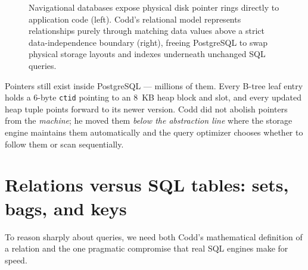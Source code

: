 \begin{figure}[htbp]
\caption{Navigational databases expose physical disk pointer rings directly to application code (left). Codd's relational model represents relationships purely through matching data values above a strict data-independence boundary (right), freeing PostgreSQL to swap physical storage layouts and indexes underneath unchanged SQL queries.}
\label{ch01:fig-codd-independence}
\end{figure}

\begin{intuitionbox}
Pointers still exist inside PostgreSQL --- millions of them. Every B-tree leaf entry holds a 6-byte \texttt{ctid} pointing to an 8~KB heap block and slot, and every updated heap tuple points forward to its newer version. Codd did not abolish pointers from the \emph{machine}; he moved them \emph{below the abstraction line} where the storage engine maintains them automatically and the query optimizer chooses whether to follow them or scan sequentially.
\end{intuitionbox}

\section{Relations versus SQL tables: sets, bags, and keys}
\label{sec:ch01-sets-bags}

To reason sharply about queries, we need both Codd's mathematical definition of a relation and the one pragmatic compromise that real SQL engines make for speed.


